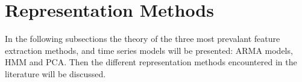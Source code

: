 \section{Representation Methods}


In the following subsections the theory of the three most prevalant feature extraction methods, and time series models will be presented: ARMA models, HMM and PCA.
Then the different representation methods encountered in the literature will be discussed.

